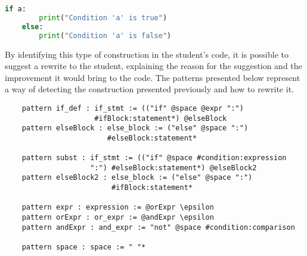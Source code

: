 \begin{lstlisting}[language=Python]
    if a:
        print("Condition 'a' is true")
    else:
        print("Condition 'a' is false")
\end{lstlisting}

By identifying this type of construction in the student's code, it is possible 
to suggest a rewrite to the student, explaining the reason for the suggestion 
and the improvement it would bring to the code. The patterns presented below 
represent a way of detecting the construction presented previously and how to 
rewrite it.

    
    
    
\begin{verbatim}
    pattern if_def : if_stmt := (("if" @space @expr ":") 
                     #ifBlock:statement*) @elseBlock
    pattern elseBlock : else_block := ("else" @space ":") 
                        #elseBlock:statement*

    pattern subst : if_stmt := (("if" @space #condition:expression 
                    ":") #elseBlock:statement*) @elseBlock2
    pattern elseBlock2 : else_block := ("else" @space ":") 
                         #ifBlock:statement*

    pattern expr : expression := @orExpr \epsilon
    pattern orExpr : or_expr := @andExpr \epsilon
    pattern andExpr : and_expr := "not" @space #condition:comparison

    pattern space : space := " "*
\end{verbatim}

